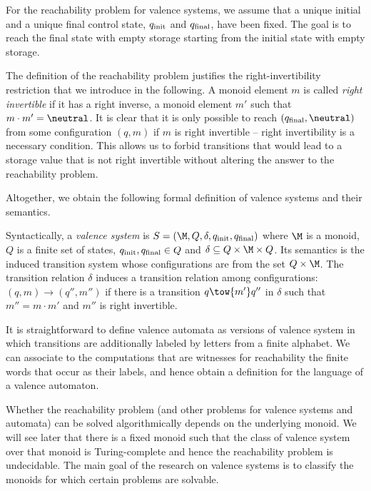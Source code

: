 \documentclass[../../diss.tex]{subfiles}
\begin{document}
For the reachability problem for valence systems, we assume that a unique initial and a unique final control state, $q_{\text{init}}$ and $q_{\text{final}}$, have been fixed.
The goal is to reach the final state with empty storage starting from the initial state with empty storage.

\begin{problem}
\end{problem}

The definition of the reachability problem justifies the right-invertibility restriction that we introduce in the following.
A monoid element $m$ is called \emph{right invertible} if it has a right inverse, a monoid element $m'$ such that $m \cdot m' = \neutral$.
It is clear that it is only possible to reach $(q_\final,\neutral)$ from some configuration $(q,m)$ if $m$ is right invertible -- right invertibility is a necessary condition.
This allows us to forbid transitions that would lead to a storage value that is not right invertible without altering the answer to the reachability problem.

Altogether, we obtain the following formal definition of valence systems and their semantics.

\begin{definition}
    Syntactically, a \emph{valence system} is \( \lts = (\monoid, Q, \delta, \qinit, \qfinal) \)
    where $\monoid$ is a monoid, $Q$ is a finite set of states, $q_{\text{init}}, q_{\text{final}} \in Q$ and $\delta \subseteq Q \times \monoid \times Q$.
    Its semantics is the induced transition system whose configurations are from the set $Q \times \monoid$.
    The transition relation $\delta$ induces a transition relation among configurations: $(q,m) \to (q'',m'')$ if there is a transition $q \tow{m'} q''$ in $\delta$ such that $m'' = m \cdot m'$ and $m''$ is right invertible.
\end{definition}

It is straightforward to define valence automata as versions of valence system in which transitions are additionally labeled by letters from a finite alphabet.
We can associate to the computations that are witnesses for reachability the finite words that occur as their labels, and hence obtain a definition for the language of a valence automaton.

Whether the reachability problem (and other problems for valence systems and automata) can be solved algorithmically depends on the underlying monoid.
We will see later that there is a fixed monoid such that the class of valence system over that monoid is Turing-complete and hence the reachability problem is undecidable.
The main goal of the research on valence systems is to classify the monoids for which certain problems are solvable.
\end{document}
